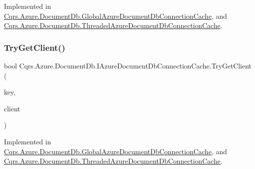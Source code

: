 Implemented in \hyperlink{classCqrs_1_1Azure_1_1DocumentDb_1_1GlobalAzureDocumentDbConnectionCache_a19c4bcbf0149036557fb8a3a3b687c79_a19c4bcbf0149036557fb8a3a3b687c79}{Cqrs.\+Azure.\+Document\+Db.\+Global\+Azure\+Document\+Db\+Connection\+Cache}, and \hyperlink{classCqrs_1_1Azure_1_1DocumentDb_1_1ThreadedAzureDocumentDbConnectionCache_a069d9161ed5649cc3e65cda641d5173d_a069d9161ed5649cc3e65cda641d5173d}{Cqrs.\+Azure.\+Document\+Db.\+Threaded\+Azure\+Document\+Db\+Connection\+Cache}.

\mbox{\label{interfaceCqrs_1_1Azure_1_1DocumentDb_1_1IAzureDocumentDbConnectionCache_a56a01a4224cb64d9349913e5237cebda_a56a01a4224cb64d9349913e5237cebda}} 
\subsubsection{\texorpdfstring{Try\+Get\+Client()}{TryGetClient()}}
{\footnotesize\ttfamily bool Cqrs.\+Azure.\+Document\+Db.\+I\+Azure\+Document\+Db\+Connection\+Cache.\+Try\+Get\+Client (\begin{DoxyParamCaption}\item[{string}]{key,  }\item[{out Document\+Client}]{client }\end{DoxyParamCaption})}



Implemented in \hyperlink{classCqrs_1_1Azure_1_1DocumentDb_1_1GlobalAzureDocumentDbConnectionCache_a5b91ecf67ee594a0a6a4d3193f381c6e_a5b91ecf67ee594a0a6a4d3193f381c6e}{Cqrs.\+Azure.\+Document\+Db.\+Global\+Azure\+Document\+Db\+Connection\+Cache}, and \hyperlink{classCqrs_1_1Azure_1_1DocumentDb_1_1ThreadedAzureDocumentDbConnectionCache_a0cf4a79ec6bcc1021182f95ddc27edea_a0cf4a79ec6bcc1021182f95ddc27edea}{Cqrs.\+Azure.\+Document\+Db.\+Threaded\+Azure\+Document\+Db\+Connection\+Cache}.

\mbox{\label{interfaceCqrs_1_1Azure_1_1DocumentDb_1_1IAzureDocumentDbConnectionCache_ac2ab3e4a1c093f10d0b55634d4990ab2_ac2ab3e4a1c093f10d0b55634d4990ab2}} 
